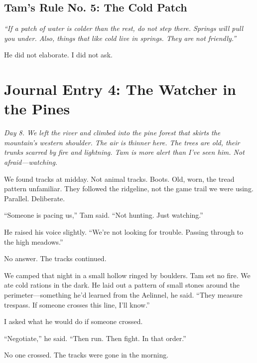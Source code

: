 \documentclass[11pt]{article}
\begin{document}
\subsection*{Tam's Rule No. 5: The Cold Patch}
\textit{``If a patch of water is colder than the rest, do not step there. Springs will pull you under. Also, things that like cold live in springs. They are not friendly.''}

He did not elaborate. I did not ask.

\section*{Journal Entry 4: The Watcher in the Pines}
\textit{Day 8. We left the river and climbed into the pine forest that skirts the mountain's western shoulder. The air is thinner here. The trees are old, their trunks scarred by fire and lightning. Tam is more alert than I've seen him. Not afraid---watching.}

We found tracks at midday. Not animal tracks. Boots. Old, worn, the tread pattern unfamiliar. They followed the ridgeline, not the game trail we were using. Parallel. Deliberate.

``Someone is pacing us,'' Tam said. ``Not hunting. Just watching.''

He raised his voice slightly. ``We're not looking for trouble. Passing through to the high meadows.''

No answer. The tracks continued.

We camped that night in a small hollow ringed by boulders. Tam set no fire. We ate cold rations in the dark. He laid out a pattern of small stones around the perimeter---something he'd learned from the Aelinnel, he said. ``They measure trespass. If someone crosses this line, I'll know.''

I asked what he would do if someone crossed.

``Negotiate,'' he said. ``Then run. Then fight. In that order.''

No one crossed. The tracks were gone in the morning.
\end{document}
